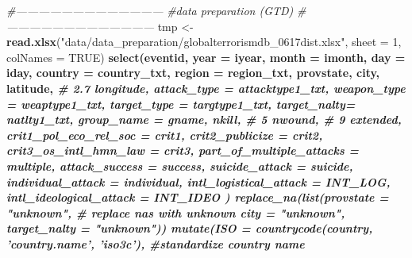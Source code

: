 \documentclass[11pt,oneside,a4paper]{reedthesis}
\newenvironment{Shaded}{\begin{snugshade}}{\end{snugshade}}
\newcommand{\KeywordTok}[1]{\textcolor[rgb]{0.13,0.29,0.53}{\textbf{#1}}}
\newcommand{\DataTypeTok}[1]{\textcolor[rgb]{0.13,0.29,0.53}{#1}}
\newcommand{\DecValTok}[1]{\textcolor[rgb]{0.00,0.00,0.81}{#1}}
\newcommand{\StringTok}[1]{\textcolor[rgb]{0.31,0.60,0.02}{#1}}
\newcommand{\CommentTok}[1]{\textcolor[rgb]{0.56,0.35,0.01}{\textit{#1}}}
\newcommand{\OtherTok}[1]{\textcolor[rgb]{0.56,0.35,0.01}{#1}}
\newcommand{\OperatorTok}[1]{\textcolor[rgb]{0.81,0.36,0.00}{\textbf{#1}}}
\newcommand{\NormalTok}[1]{#1}
\begin{document}
\begin{Shaded}
\begin{Highlighting}[]
{{{{\CommentTok{#---------------------------------------}
\CommentTok{#data preparation (GTD)}
\CommentTok{#---------------------------------------}
\NormalTok{tmp <-}\StringTok{ }\KeywordTok{read.xlsx}\NormalTok{(}\StringTok{"data/data_preparation/globalterrorismdb_0617dist.xlsx"}\NormalTok{, }
                 \DataTypeTok{sheet =} \DecValTok{1}\NormalTok{, }\DataTypeTok{colNames =} \OtherTok{TRUE}\NormalTok{) }\OperatorTok{%
\StringTok{  }\KeywordTok{select}\NormalTok{(eventid, }
         \DataTypeTok{year =}\NormalTok{ iyear, }
         \DataTypeTok{month =}\NormalTok{ imonth, }
         \DataTypeTok{day =}\NormalTok{ iday, }
         \DataTypeTok{country =}\NormalTok{ country_txt, }
         \DataTypeTok{region =}\NormalTok{ region_txt, }
\NormalTok{         provstate, }
\NormalTok{         city, }
\NormalTok{         latitude, }\CommentTok{# 2.7%
\NormalTok{         longitude,}
         \DataTypeTok{attack_type =}\NormalTok{ attacktype1_txt, }
         \DataTypeTok{weapon_type =}\NormalTok{ weaptype1_txt, }
         \DataTypeTok{target_type =}\NormalTok{ targtype1_txt, }
         \DataTypeTok{target_nalty=}\NormalTok{ natlty1_txt, }
         \DataTypeTok{group_name  =}\NormalTok{ gname, }
\NormalTok{         nkill,   }\CommentTok{# 5%
\NormalTok{         nwound,  }\CommentTok{# 9%
\NormalTok{         extended, }
         \DataTypeTok{crit1_pol_eco_rel_soc =}\NormalTok{ crit1, }
         \DataTypeTok{crit2_publicize =}\NormalTok{ crit2, }
         \DataTypeTok{crit3_os_intl_hmn_law =}\NormalTok{ crit3, }
         \DataTypeTok{part_of_multiple_attacks =}\NormalTok{ multiple, }
         \DataTypeTok{attack_success =}\NormalTok{ success, }
         \DataTypeTok{suicide_attack =}\NormalTok{ suicide, }
         \DataTypeTok{individual_attack =}\NormalTok{ individual,}
         \DataTypeTok{intl_logistical_attack =}\NormalTok{ INT_LOG, }
         \DataTypeTok{intl_ideological_attack =}\NormalTok{ INT_IDEO }
\NormalTok{         ) }\OperatorTok{%
\StringTok{  }\KeywordTok{replace_na}\NormalTok{(}\KeywordTok{list}\NormalTok{(}\DataTypeTok{provstate =} \StringTok{"unknown"}\NormalTok{,       }\CommentTok{# replace nas with unknown}
                  \DataTypeTok{city =}  \StringTok{"unknown"}\NormalTok{,}
                  \DataTypeTok{target_nalty =} \StringTok{"unknown"}\NormalTok{)) }\OperatorTok{%
\StringTok{  }\KeywordTok{mutate}\NormalTok{(}\DataTypeTok{ISO =} \KeywordTok{countrycode}\NormalTok{(country, }\StringTok{'country.name'}\NormalTok{, }\StringTok{'iso3c'}\NormalTok{), }\CommentTok{#standardize country name}
}}}}}}}}}}
\end{Highlighting}
\end{Shaded}
\end{document}
